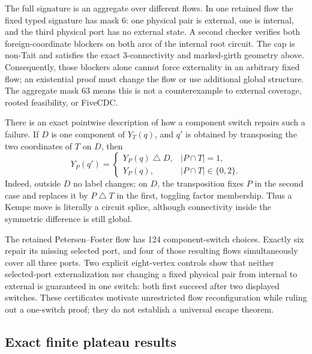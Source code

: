 \documentclass[11pt]{article}
\theoremstyle{definition}
\theoremstyle{remark}
\begin{document}
The full signature is an aggregate over different flows.  In one retained
flow the fixed typed signature has mask 6: one physical pair is external,
one is internal, and the third physical port has no external state.  A
second checker verifies both foreign-coordinate blockers on both arcs of the
internal root circuit.  The cap is non-Tait and satisfies the exact
3-connectivity and marked-girth geometry above.  Consequently, those
blockers alone cannot force externality in an arbitrary fixed flow; an
existential proof must change the flow or use additional global structure.
The aggregate mask 63 means this is not a counterexample to external
coverage, rooted feasibility, or FiveCDC.

There is an exact pointwise description of how a component switch repairs
such a failure.  If \(D\) is one component of \(Y_T(q)\), and \(q'\) is
obtained by transposing the two coordinates of \(T\) on \(D\), then
\[
 Y_P(q')=
 \begin{cases}
  Y_P(q)\mathbin\triangle D,&|P\cap T|=1,\\
  Y_P(q),&|P\cap T|\in\{0,2\}.
 \end{cases}                                             \tag{21d}
\]
Indeed, outside \(D\) no label changes; on \(D\), the transposition fixes
\(P\) in the second case and replaces it by \(P\mathbin\triangle T\) in
the first, toggling factor membership.  Thus a Kempe move is literally a
circuit splice, although connectivity inside the symmetric difference is
still global.

The retained Petersen--Foster flow has 124 component-switch choices.
Exactly six repair its missing selected port, and four of those resulting
flows simultaneously cover all three ports.  Two explicit eight-vertex
controls show that neither selected-port externalization nor changing a
fixed physical pair from internal to external is guaranteed in one switch:
both first succeed after two displayed switches.  These certificates
motivate unrestricted flow reconfiguration while ruling out a one-switch
proof; they do not establish a universal escape theorem.

\subsection{Exact finite plateau results}
\end{document}
